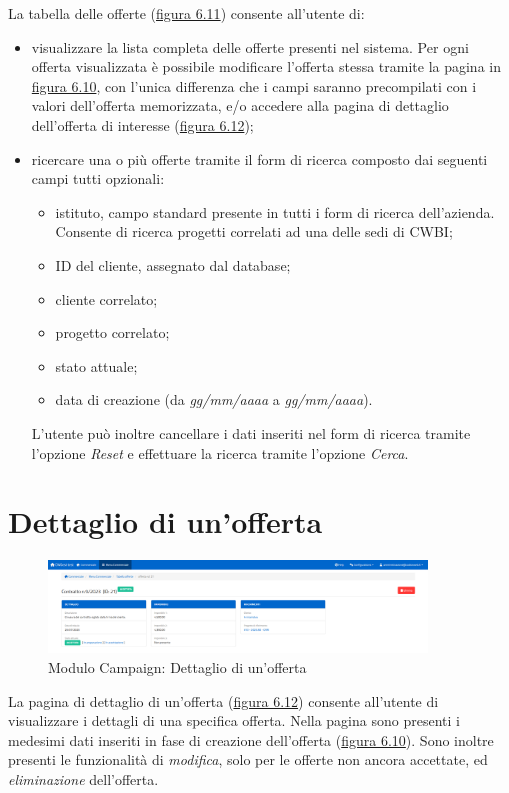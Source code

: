 \noindent La tabella delle offerte ({\hyperref[fig:tabellaOfferte]{figura 6.11}}) consente all'utente di:
\begin{itemize}
\item visualizzare la lista completa delle offerte presenti nel sistema. Per ogni offerta visualizzata è possibile modificare l'offerta stessa tramite la pagina in {\hyperref[fig:nuovaOfferta]{figura 6.10}}, con l'unica differenza che i campi saranno precompilati con i valori dell'offerta memorizzata, e/o accedere alla  pagina di dettaglio dell'offerta di interesse ({\hyperref[fig:dettaglioOfferta]{figura 6.12}}); 
\item ricercare una o più offerte tramite il form di ricerca composto dai seguenti campi tutti opzionali:
\begin{itemize}
\item istituto, campo standard presente in tutti i form di ricerca dell'azienda. Consente di ricerca progetti correlati ad una delle sedi di CWBI;
\item ID del cliente, assegnato dal database;
\item cliente correlato;
\item progetto correlato;
\item stato attuale;
\item data di creazione (da \textit{gg/mm/aaaa} a \textit{gg/mm/aaaa}).
\end{itemize}
L'utente può inoltre cancellare i dati inseriti nel form di ricerca tramite l'opzione \textit{Reset} e effettuare la ricerca tramite l'opzione \textit{Cerca}.
\end{itemize}

\pagebreak

\section{Dettaglio di un'offerta}
\begin{figure}[!h]
\centering
\includegraphics[width=380px]{../images/UI/12-dettaglioOfferta.png}
\caption{Modulo Campaign: Dettaglio di un'offerta}
\label{fig:dettaglioOfferta}
\end{figure}

\noindent La pagina di dettaglio di un'offerta ({\hyperref[fig:dettaglioOfferta]{figura 6.12}}) consente all'utente di visualizzare i dettagli di una specifica offerta. Nella pagina sono presenti i medesimi dati inseriti in fase di creazione dell'offerta ({\hyperref[fig:nuovaOfferta]{figura 6.10}}). Sono inoltre presenti le funzionalità di \textit{modifica}, solo per le offerte non ancora accettate, ed \textit{eliminazione} dell'offerta.